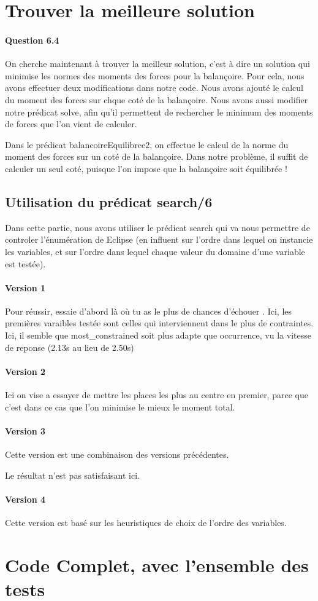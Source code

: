 \documentclass[11pt]{article} %
\begin{document}
\section{Trouver la meilleure solution}
\paragraph{Question 6.4} On cherche maintenant à trouver la meilleur solution, c'est à dire un solution qui minimise les normes des moments des forces pour la balançoire.
Pour cela, nous avons effectuer deux modifications dans notre code. Nous avons ajouté le calcul du moment des forces sur chque coté de la balançoire. Nous avons aussi modifier notre prédicat solve, afin qu'il permettent de rechercher le minimum des moments de forces que l'on vient de calculer.

Dans le prédicat balancoireEquilibree2, on effectue le calcul de la norme du moment des forces sur un coté de la balançoire. Dans notre problème, il suffit de calculer un seul coté, puisque l'on impose que la balançoire soit équilibrée !

\subsection*{Utilisation du prédicat \textbf{search/6}}
Dans cette partie, nous avons utiliser le prédicat search qui va nous permettre de controler l'énumération de Eclipse (en influent sur l'ordre dans lequel on instancie les variables, et sur l'ordre dans lequel chaque valeur du domaine d'une variable est testée).
\paragraph{Version 1} \og Pour réussir, essaie d'abord là où tu as le plus de chances d'échouer \fg. Ici, les premières varaibles testée sont celles qui interviennent dans le plus de contraintes.
 Ici, il semble que most\_constrained soit plus adapte que occurrence, vu la vitesse de reponse (2.13s au lieu de 2.50s)
\paragraph{Version 2}
Ici on vise a essayer de mettre les places les plus au centre en premier,
parce que c'est dans ce cas que l'on minimise le mieux le moment total.

\paragraph{Version 3}
Cette version est une combinaison des versions précédentes.

Le résultat n'est pas satisfaisant ici.
\paragraph{Version 4} Cette version est basé sur les heuristiques de choix de l'ordre des variables.

\newpage

\section{Code Complet, avec l'ensemble des tests}

\end{document}
